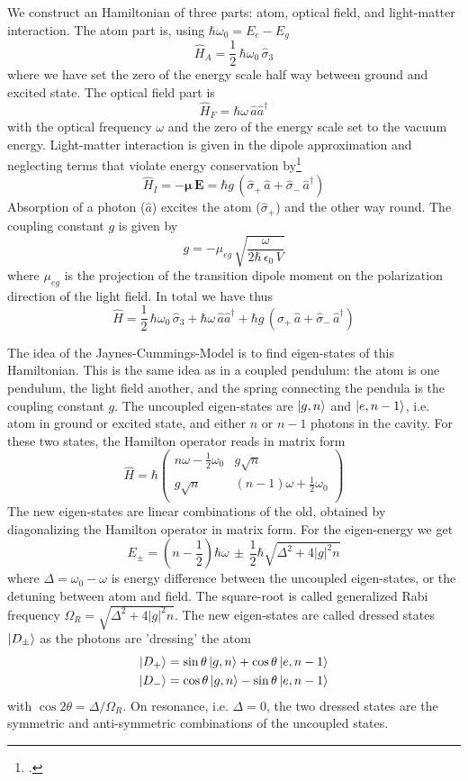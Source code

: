 We construct an Hamiltonian of three parts:  atom, optical field, and light-matter interaction. The atom part is, using $\hbar \omega_0 = E_e - E_g$ 
\[
\hat{H}_A = \frac{1}{2} \, \hbar \omega_0 \, \hat{\sigma}_3
\]
where we have set the zero of the energy scale half way between ground and excited state. The optical field part is
\[
\hat{H}_F = \hbar \omega \, \hat{a} \hat{a}^\dagger
\]
with the optical frequency $\omega$ and the zero of the energy scale set to the vacuum energy. Light-matter interaction is given in the dipole approximation and neglecting terms that violate energy conservation by\footcite[chap. 6.7.1]{Rand2016}
\[
\hat{H}_I = - \boldsymbol{\mu} \, \boldsymbol{E} =
 \hbar g \, (\hat{\sigma}_+ \, \hat{a} + \hat{\sigma}_- \,\hat{a}^\dagger )
\]
Absorption of a photon ($\hat{a}$) excites the atom ($\hat{\sigma}_+$) and the other way round.
The coupling constant $g$ is given by
\[
 g = - \mu_{eg} \, \sqrt{\frac{\omega}{2 \hbar \, \epsilon_0 \, V}}
\]
where $\mu_{eg} $ is the projection of the transition dipole moment on the polarization direction of the light field. In total we have thus
\[
 \hat{H} = \frac{1}{2} \, \hbar \omega_0 \, \hat{\sigma}_3 
 +  \hbar \omega \, \hat{a} \hat{a}^\dagger
 + \hbar g \, (\hat{\sigma}_+ \, \hat{a} + \hat{\sigma}_- \,\hat{a}^\dagger )
\]

The idea of the Jaynes-Cummings-Model is to find eigen-states of this Hamiltonian. This is the same idea as in a coupled pendulum: the atom is one pendulum, the light field another, and the spring connecting the pendula is the coupling constant $g$. The uncoupled eigen-states are $\ket{g, n}$ and  $\ket{e, n-1}$, i.e. atom in ground or excited state, and either $n$ or $n-1$ photons in the cavity. For these two states, the Hamilton operator reads in matrix form
\[
\hat{H} = \hbar 
\begin{pmatrix}
n \omega - \frac{1}{2} \omega_0  & g \sqrt{n} \\
g \sqrt{n} & (n-1) \omega + \frac{1}{2} \omega_0 \\
\end{pmatrix}
\]
The new eigen-states are linear combinations of the old, obtained by diagonalizing the Hamilton operator in matrix form. For the eigen-energy we get
\[
E_\pm = \left( n - \frac{1}{2} \right) \hbar \omega \, \pm \, \frac{1}{2} \hbar
\sqrt{\Delta^2 + 4 |g|^2 n}
\]
where $\Delta = \omega_0 - \omega$
is energy difference between the uncoupled eigen-states, or the detuning between atom and field. The square-root is called generalized Rabi frequency $\Omega_R = \sqrt{\Delta^2 + 4 |g|^2 n}$. The new eigen-states are called dressed states $\ket{D_\pm}$ as the photons are 'dressing' the atom
\begin{eqnarray*}
\ket{D_+} = \sin \theta \ket{g,n} + \cos \theta \ket{e,n-1} \\
\ket{D_-} = \cos \theta \ket{g,n} - \sin \theta \ket{e,n-1} 
\end{eqnarray*}
with $\cos 2\theta = \Delta / \Omega_R$. On resonance, i.e. $\Delta = 0$, the two dressed states are the symmetric and anti-symmetric combinations of the uncoupled states.

